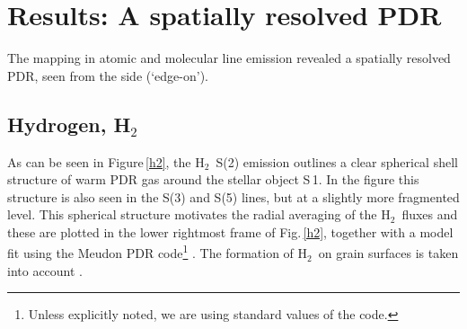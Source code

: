 \documentclass{aa}
\newcommand{\kms}{km\,s$^{-1}$}       %
\newcommand{\vlsr}{$\upsilon_{\rm LSR}$}        %
\newcommand{\tmb}{$T_{\rm mb}$}
\newcommand{\molh}{H$_{2}$}                              %
\newcommand{\water}{H$_{2}$O}
\newcommand{\molo}{O$_{2}$}                     %
\newcommand{\asec}{$^{\prime \prime}$}
\begin{document}
\begin{figure*}[ht]
  \caption{Oversampled maps in $^{13}$CO\,(7-6) (left) and C$^{17}$O\,(7-6) (right) with the 27\asec\ beam of {\it Herschel}. The \vlsr\ and \tmb\ scales are indicated in the upper right corners. The dashed vertical lines, at LSR velocities of 2.5\,\kms\ and 3.5\,\kms, respectively, identify two radial velocity components of the fitted Gaussians, shown by the smooth red curves, whereas the observations are shown as histograms.
        }
  \label{CO_iso}
\end{figure*}

\begin{figure*}
  \caption{{\bf Left:} HIFI-map of the 1.67\,THz methylidine line, CH$^+$\,(2-1), obtained simultaneously with \water\,($2_{12}-1_{01}$).
  {\bf Right:}  Small map of the emission in ethynyl, C$_2$H\,$(17/2_9-15/2_8, 19/2_9-17/2_8)$\,786\,GHz, observed together with \molo\,($5_4-3_4$)\,773\,GHz. 
  The contours and symbols are as in Fig.\,\ref{obs_outlay}.
        }
  \label{C2H}
\end{figure*}




\section{Results: A spatially resolved PDR}

The mapping in atomic and molecular line emission revealed a spatially resolved PDR, seen from the side (`edge-on'). 

\subsection{Hydrogen, \molh}

As can be seen in Figure\,\ref{h2}, the \molh\ S(2) emission outlines a clear spherical shell structure of warm PDR gas around the stellar object S\,1. In the figure this structure is also seen in the S(3) and S(5) lines, but at a slightly more fragmented level. This spherical structure motivates the radial averaging of the \molh\ fluxes and these are plotted in the lower rightmost frame of Fig.\,\ref{h2}, together with a model fit using the Meudon PDR code\footnote{Unless explicitly noted, we are using standard values of the code.} \citep[][see below]{lepetit2006}. The formation of \molh\ on grain surfaces is taken into account \citep{lepetit2009,lebourlot2012}.
\end{document}
